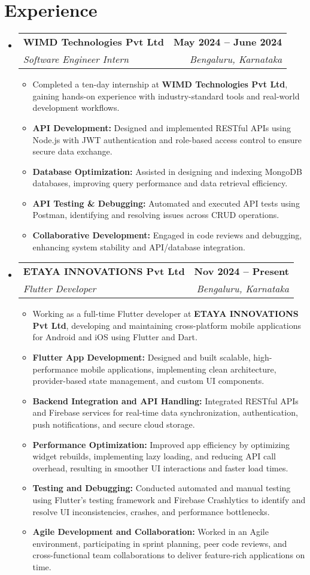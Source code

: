 \documentclass[a4paper,11pt]{article}
\makeatletter
\newcommand{\resumeItem}[1]{
	\item\small{#1 \vspace{-2pt}}
}
\newcommand{\resumeSubheading}[4]{
	\vspace{-2pt}\item
		\begin{tabular*}{0.97\textwidth}[t]{l@{\extracolsep{\fill}}r}
			\textbf{#1} & \textbf{\small #2} \\
			\textit{\small#3} & \textit{\small #4} \\
		\end{tabular*}\vspace{-7pt}
}
\newcommand{\resumeSubHeadingListStart}{\begin{itemize}[leftmargin=0.15in, label={}]}
\newcommand{\resumeSubHeadingListEnd}{\end{itemize}}
\newcommand{\resumeItemListStart}{\begin{itemize}}
\newcommand{\resumeItemListEnd}{\end{itemize}\vspace{-5pt}}
\makeatother
\begin{document}
\section{Experience}
\resumeSubHeadingListStart
\resumeSubheading
{WIMD Technologies Pvt Ltd}{May 2024 -- June 2024}
{Software Engineer Intern}{Bengaluru, Karnataka}
\resumeItemListStart
\resumeItem{Completed a ten-day internship at \textbf{WIMD Technologies Pvt Ltd}, gaining hands-on experience with industry-standard tools and real-world development workflows.}
\resumeItem{\textbf{API Development:} Designed and implemented RESTful APIs using Node.js with JWT authentication and role-based access control to ensure secure data exchange.}
\resumeItem{\textbf{Database Optimization:} Assisted in designing and indexing MongoDB databases, improving query performance and data retrieval efficiency.}
\resumeItem{\textbf{API Testing \& Debugging:} Automated and executed API tests using Postman, identifying and resolving issues across CRUD operations.}
\resumeItem{\textbf{Collaborative Development:} Engaged in code reviews and debugging, enhancing system stability and API/database integration.}
\resumeItemListEnd
\resumeSubheading
{ETAYA INNOVATIONS Pvt Ltd}{Nov 2024 -- Present}
{Flutter Developer }{Bengaluru, Karnataka}
\resumeItemListStart
\resumeItem{Working as a full-time Flutter developer at \textbf{ETAYA INNOVATIONS Pvt Ltd}, developing and maintaining cross-platform mobile applications for Android and iOS using Flutter and Dart.}
\resumeItem{\textbf{Flutter App Development:} Designed and built scalable, high-performance mobile applications, implementing clean architecture, provider-based state management, and custom UI components.}
\resumeItem{\textbf{Backend Integration and API Handling:} Integrated RESTful APIs and Firebase services for real-time data synchronization, authentication, push notifications, and secure cloud storage.}
\resumeItem{\textbf{Performance Optimization:} Improved app efficiency by optimizing widget rebuilds, implementing lazy loading, and reducing API call overhead, resulting in smoother UI interactions and faster load times.}
\resumeItem{\textbf{Testing and Debugging:} Conducted automated and manual testing using Flutter's testing framework and Firebase Crashlytics to identify and resolve UI inconsistencies, crashes, and performance bottlenecks.}
\resumeItem{\textbf{Agile Development and Collaboration:} Worked in an Agile environment, participating in sprint planning, peer code reviews, and cross-functional team collaborations to deliver feature-rich applications on time.}
\resumeItemListEnd
\resumeSubHeadingListEnd
\end{document}
